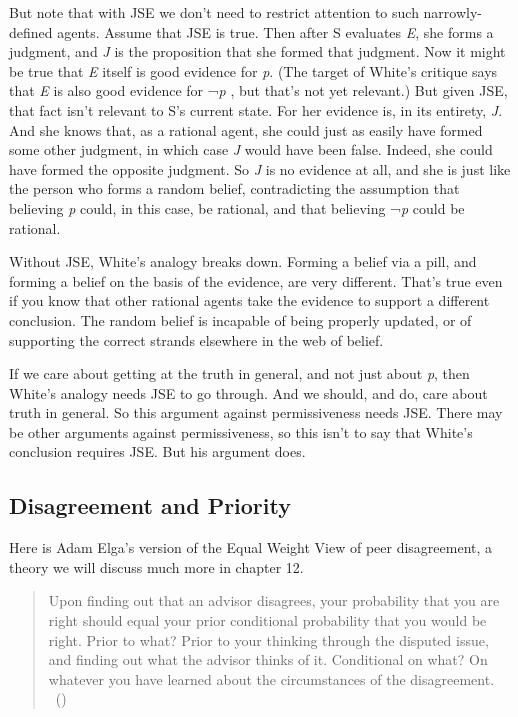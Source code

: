 \documentclass[
  10pt,
  letterpaper,
  twoside]{scrbook}
\begin{document}
But note that with JSE we don't need to restrict attention to such
narrowly-defined agents. Assume that JSE is true. Then after S evaluates
\emph{E}, she forms a judgment, and \emph{J} is the proposition that she
formed that judgment. Now it might be true that \emph{E} itself is good
evidence for \emph{p}. (The target of White's critique says that
\emph{E} is also good evidence for ¬\emph{p} , but that's not yet
relevant.) But given JSE, that fact isn't relevant to S's current state.
For her evidence is, in its entirety, \emph{J}. And she knows that, as a
rational agent, she could just as easily have formed some other
judgment, in which case \emph{J} would have been false. Indeed, she
could have formed the opposite judgment. So \emph{J} is no evidence at
all, and she is just like the person who forms a random belief,
contradicting the assumption that believing \emph{p} could, in this
case, be rational, and that believing ¬\emph{p} could be rational.

Without JSE, White's analogy breaks down. Forming a belief via a pill,
and forming a belief on the basis of the evidence, are very different.
That's true even if you know that other rational agents take the
evidence to support a different conclusion. The random belief is
incapable of being properly updated, or of supporting the correct
strands elsewhere in the web of belief.

If we care about getting at the truth in general, and not just about
\emph{p}, then White's analogy needs JSE to go through. And we should,
and do, care about truth in general. So this argument against
permissiveness needs JSE. There may be other arguments against
permissiveness, so this isn't to say that White's conclusion requires
JSE. But his argument does.

\subsection{Disagreement and Priority}\label{disagreementandpriority}

Here is Adam Elga's version of the Equal Weight View of peer
disagreement, a theory we will discuss much more in chapter 12.

\begin{quote}
Upon finding out that an advisor disagrees, your probability that you
are right should equal your prior conditional probability that you would
be right. Prior to what? Prior to your thinking through the disputed
issue, and finding out what the advisor thinks of it. Conditional on
what? On whatever you have learned about the circumstances of the
disagreement. ~()
\end{quote}
\end{document}
